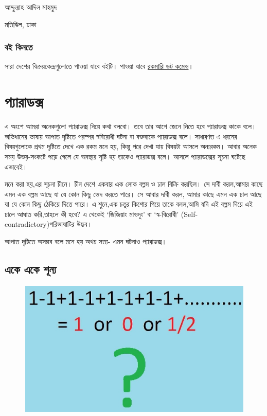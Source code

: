 \documentclass[
]{book}
\begin{document}
আব্দুল্যাহ আদিল মাহমুদ

মতিঝিল, ঢাকা

\hypertarget{ux9acux987-ux995ux9a8ux9a4}{%
\section{বই কিনতে}\label{ux9acux987-ux995ux9a8ux9a4}}

সারা দেশের বিক্রয়কেন্দ্রগুলোতে পাওয়া যাবে বইটি। পাওয়া যাবে \href{https://www.rokomari.com/book/author/47631}{রকমারি ডট কমেও}।

\hypertarget{part-ux9aaux9afux9b0ux9a1ux995ux9b8}{%
\part{প্যারাডক্স}\label{part-ux9aaux9afux9b0ux9a1ux995ux9b8}}

এ অংশে আমরা অনেকগুলো প্যারাডক্স নিয়ে কথা বলবো। তবে তার আগে জেনে নিতে হবে প্যারাডক্স কাকে বলে। অভিধানের ভাষায় আপাত দৃষ্টিতে পরস্পর স্ববিরোধী ঘটনা বা বক্তব্যকে প্যারাডক্স বলে। সাধারণত এ ধরনের বিষয়গুলোকে প্রথম দৃষ্টিতে দেখে এক রকম মনে হয়, কিন্তু পরে দেখা যায় বিষয়টা আসলে অন্যরকম। আবার অনেক সময় উভয়-সংকটে পড়ে গেলে যে অবস্থার সৃষ্টি হয় তাকেও প্যারাডক্স বলে। আসলে প্যারাডক্সের সূচনা ঘটেছে এভাবেই।

মনে করা হয়,এর সূচনা চীনে। চীন দেশে একবার এক লোক বল্লম ও ঢাল বিক্রি করছিল। সে দাবী করল,আমার কাছে এমন এক বল্লম আছে যা যে কোন কিছু ভেদ করতে পারে। সে আবার দাবী করল, আমার কাছে এমন এক ঢাল আছে যা যে কোন কিছু ঠেকিয়ে দিতে পারে। এ শুনে,এক চতুর কিশোর গিয়ে তাকে বলল,আমি যদি এই বল্লম দিয়ে এই ঢালে আঘাত করি,তাহলে কী হবে?
এ থেকেই `জিজিয়াং মাওদুং' বা `স্ব-বিরোধী' (Self-contradictory)পরিভাষাটির উদ্ভব।

আপাত দৃষ্টিতে অসম্ভব বলে মনে হয় অথচ সত্য- এমন ঘটনাও প্যারাডক্স।

\hypertarget{one-one-zero}{%
\chapter{একে একে শূন্য}\label{one-one-zero}}

\begin{figure}

{\centering \includegraphics[width=0.8\linewidth]{img/grandi_series} 

}

\end{figure}
\end{document}
